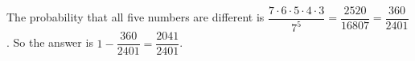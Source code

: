 The probability that all five numbers are different is $\dfrac{7\cdot6\cdot5\cdot4\cdot3}{7^5}=\dfrac{2520}{16807}=\dfrac{360}{2401}$. So the answer is $1-\dfrac{360}{2401}=\boxed{\dfrac{2041}{2401}}$.
